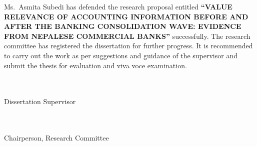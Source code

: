 \clearpage
{}
\thispagestyle{plain}

\fontsize{12}{20.76}\selectfont
Ms.~Asmita Subedi has defended the research proposal entitled \textbf{``VALUE RELEVANCE OF ACCOUNTING INFORMATION BEFORE AND AFTER THE BANKING CONSOLIDATION WAVE: EVIDENCE FROM NEPALESE COMMERCIAL BANKS''} successfully. The research committee has registered the dissertation for further progress. It is recommended to carry out the work as per suggestions and guidance of the supervisor \makebox[5cm]{\dotfill} and submit the thesis for evaluation and viva voce examination.

\vspace{1.24cm}

\fontsize{12}{14.5}\selectfont
{\setlength{\fboxsep}{8pt}
\noindent\parbox[t]{200pt}{\makebox[120pt]{\dotfill}\\[15.5pt]\makebox[120pt]{\dotfill}\\[13.5pt]Dissertation Supervisor}\hspace{10pt}\parbox[t]{223pt}{}
\par\vspace{1.11cm}
\noindent\hfill\parbox[t]{223pt}{}
\par\vspace{1.48cm}
\noindent\parbox[t]{200pt}{\makebox[120pt]{\dotfill}\\[15.5pt]\makebox[120pt]{\dotfill}\\[13.5pt]Chairperson, Research Committee}\hspace{10pt}\parbox[t]{223pt}{}}
